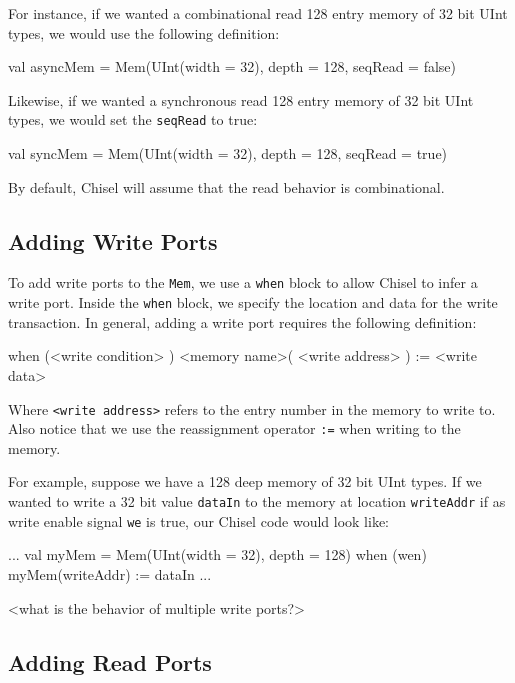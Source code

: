 \documentclass[twocolumn, 10pt]{article}
\begin{document}
For instance, if we wanted a combinational read 128 entry memory of 32 bit UInt types, we would use the following definition:

\begin{scala}
val asyncMem = Mem(UInt(width = 32), depth = 128, seqRead = false)
\end{scala}

Likewise, if we wanted a synchronous read 128 entry memory of 32 bit UInt types, we would set the \verb+seqRead+ to true:

\begin{scala}
val syncMem = Mem(UInt(width = 32), depth = 128, seqRead = true)
\end{scala}

By default, Chisel will assume that the read behavior is combinational.

\subsection{Adding Write Ports}

To add write ports to the \verb+Mem+, we use a \verb+when+ block to allow Chisel to infer a write port. Inside the \verb+when+ block, we specify the location and data for the write transaction. In general, adding a write port requires the following definition:

\begin{scala}
when (<write condition> ) {
  <memory name>( <write address> ) := <write data>
}
\end{scala}

Where \verb+<write address>+ refers to the entry number in the memory to write to. Also notice that we use the reassignment operator \verb+:=+ when writing to the memory. 


For example, suppose we have a 128 deep memory of 32 bit UInt types. If we wanted to write a 32 bit value \verb+dataIn+ to the memory at location \verb+writeAddr+ if as write enable signal \verb+we+ is true, our Chisel code would look like:

\begin{scala}
...
val myMem = Mem(UInt(width = 32), depth = 128)
when (wen) {
  myMem(writeAddr) := dataIn
}
...
\end{scala}

<what is the behavior of multiple write ports?>

\subsection{Adding Read Ports}
\end{document}
